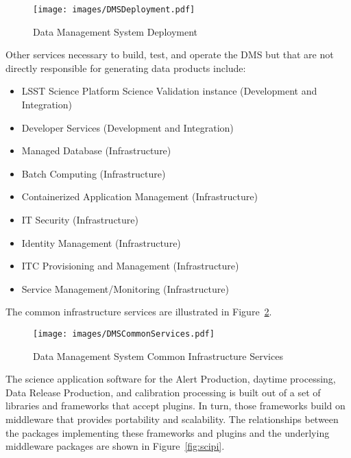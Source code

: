 \documentclass[DM,toc,lsstdraft]{lsstdoc}
\begin{document}
\begin{figure}
\centering
\texttt{[image: images/DMSDeployment.pdf]}
\caption{Data Management System Deployment}
\label{fig:deployment}
\end{figure}

Other services necessary to build, test, and operate the DMS but that are not directly responsible for generating data products include:
\begin{itemize}
\item
  LSST Science Platform Science Validation instance (Development and Integration)
\item
  Developer Services (Development and Integration)
\item
  Managed Database (Infrastructure)
\item
  Batch Computing (Infrastructure)
\item
  Containerized Application Management (Infrastructure)
\item
  IT Security (Infrastructure)
\item
  Identity Management (Infrastructure)
\item
  ITC Provisioning and Management (Infrastructure)
\item
  Service Management/Monitoring (Infrastructure)
\end{itemize}

The common infrastructure services are illustrated in Figure~\ref{fig:commonservices}.

\begin{figure}
\centering
\texttt{[image: images/DMSCommonServices.pdf]}
\caption{Data Management System Common Infrastructure Services}
\label{fig:commonservices}
\end{figure}

The science application software for the Alert Production, daytime
processing, Data Release Production, and calibration processing is built
out of a set of libraries and frameworks that accept plugins. In turn, those
frameworks build on middleware that provides portability and
scalability.  The relationships between the packages implementing
these frameworks and plugins and the underlying middleware packages
are shown in Figure~\ref{fig:scipi}.
\end{document}
